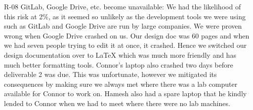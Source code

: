 R-08 GitLab, Google Drive, etc. become unavailable: We had the likelihood of this risk at 2\%, as it seemed so unlikely as the development tools we were using such as GitLab and Google Drive are run by large companies. We were proven wrong when Google Drive crashed on us. Our design doc was 60 pages and when we had seven people trying to edit it at once, it crashed. Hence we switched our design documentation over to LaTeX which was much more friendly and has much better formatting tools.
Connor's laptop also crashed two days before deliverable 2 was due. This was unfortunate, however we mitigated its consequences by making sure we always met where there was a lab computer available for Connor to work on. Hamesh also had a spare laptop that he kindly lended to Connor when we had to meet where there were no lab machines.